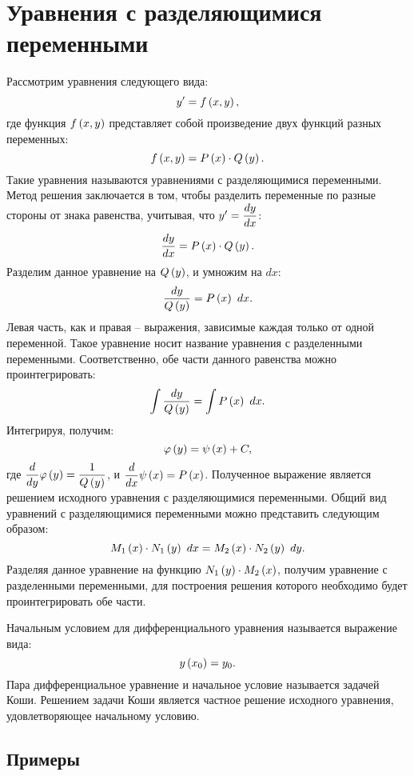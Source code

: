 \section{Уравнения с разделяющимися переменными}

	Рассмотрим уравнения следующего вида:
	\[ y' = f \left( x, y \right), \]
	где функция $f\left( x, y \right)$ представляет собой произведение двух функций разных переменных:
	\[ f\left( x, y \right) = P \left( x \right) \cdot Q \left( y \right). \]
	Такие уравнения называются уравнениями с разделяющимися переменными. Метод решения заключается в том, чтобы разделить переменные по разные стороны от знака равенства, учитывая, что $y' = \dfrac{d y}{d x}$:
	\[ \dfrac{d y}{d x} = P \left( x \right) \cdot Q \left( y \right). \]
	Разделим данное уравнение на $Q \left( y \right)$, и умножим на $dx$:
	\[ \frac{dy}{Q \left( y \right)} = P \left( x \right) ~ dx. \]
	Левая часть, как и правая -- выражения, зависимые каждая только от одной переменной. Такое уравнение носит название уравнения с разделенными переменными. Соответственно, обе части данного равенства можно проинтегрировать:
	\[ \int \frac{dy}{Q \left( y \right)} = \int P \left( x \right) ~ dx. \]
	Интегрируя, получим:
	\[ \varphi \left( y \right) = \psi \left( x \right) + C, \]
	где $\dfrac{d }{d y} \varphi \left( y \right) = \dfrac{1}{Q \left( y \right)}$, и $\dfrac{d }{d x} \psi \left( x \right) = P \left( x \right)$. Полученное выражение является решением исходного уравнения с разделяющимися переменными. Общий вид уравнений с разделяющимися переменными можно представить следующим образом:
	\[ M_1 \left( x \right) \cdot N_1 \left( y \right) ~ dx = M_2 \left( x \right) \cdot N_2 \left( y \right) ~ dy. \]
	Разделяя данное уравнение на функцию $N_1 \left( y \right) \cdot M_2 \left( x \right)$, получим уравнение с разделенными переменными, для построения решения которого необходимо будет проинтегрировать обе части.

	Начальным условием для дифференциального уравнения называется выражение вида:
	\[ y \left( x_0 \right) = y_0. \]
	Пара дифференциальное уравнение и начальное условие называется задачей Коши. Решением задачи Коши является частное решение исходного уравнения, удовлетворяющее начальному условию.

	\subsection{Примеры}

